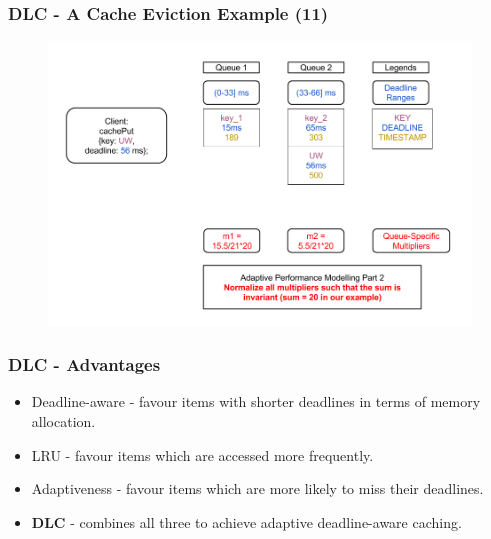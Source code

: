 \documentclass{beamer}
\newcommand{\myv}{\vspace{3 mm}}
\begin{document}
\begin{frame}
  \frametitle{DLC - A Cache Eviction Example (11)}
  \begin{figure}
    \begin{center}
      \centerline{\includegraphics[scale=0.33]{img/DLC_V5_11.png}}
    \end{center}
  \end{figure}
\end{frame}


\begin{frame}
  \frametitle{DLC - Advantages}
  \vspace{-15 mm}
  \begin{itemize}
  \item Deadline-aware - favour items with shorter deadlines in terms
    of memory allocation. \myv
  \item LRU - favour items which are accessed more frequently. \myv
  \item Adaptiveness - favour items which are more likely to miss their
    deadlines.  \myv
  \item \textbf{DLC} - combines all three to achieve adaptive deadline-aware caching.
  \end{itemize}
\end{frame}
\end{document}
